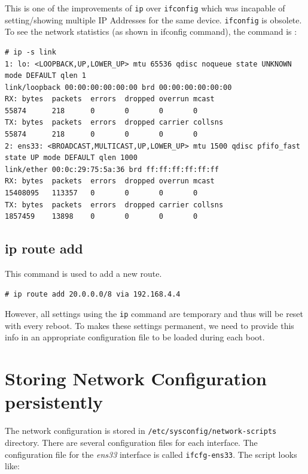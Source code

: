 \noindent
This is one of the improvements of \verb|ip| over \verb|ifconfig| which was incapable of setting/showing multiple IP Addresses for the same device. \verb|ifconfig| is obsolete. To see the network statistics (as shown in ifconfig command), the command is :

\vspace{-15pt}
\begin{verbatim}
# ip -s link
1: lo: <LOOPBACK,UP,LOWER_UP> mtu 65536 qdisc noqueue state UNKNOWN mode DEFAULT qlen 1
link/loopback 00:00:00:00:00:00 brd 00:00:00:00:00:00
RX: bytes  packets  errors  dropped overrun mcast   
55874      218      0       0       0       0       
TX: bytes  packets  errors  dropped carrier collsns 
55874      218      0       0       0       0       
2: ens33: <BROADCAST,MULTICAST,UP,LOWER_UP> mtu 1500 qdisc pfifo_fast state UP mode DEFAULT qlen 1000
link/ether 00:0c:29:75:5a:36 brd ff:ff:ff:ff:ff:ff
RX: bytes  packets  errors  dropped overrun mcast   
15408095   113357   0       0       0       0       
TX: bytes  packets  errors  dropped carrier collsns 
1857459    13898    0       0       0       0      
\end{verbatim}
\vspace{-10pt}

\subsection{ip route add}
This command is used to add a new route.

\vspace{-15pt}
\begin{verbatim}
# ip route add 20.0.0.0/8 via 192.168.4.4
\end{verbatim}
\vspace{-10pt}

\noindent
However, all settings using the \verb|ip| command are temporary and thus will be reset with every reboot. To makes these settings permanent, we need to provide this info in an appropriate configuration file to be loaded during each boot.

	\section{Storing Network Configuration persistently}
The network configuration is stored in \verb|/etc/sysconfig/network-scripts| directory. There are several configuration files for each interface. The configuration file for the \textit{ens33} interface is called \verb|ifcfg-ens33|. The script looks like:

